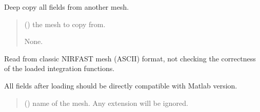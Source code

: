 \documentclass[letterpaper,10pt,english]{sphinxmanual}
\begin{document}
\begin{fulllineitems}
\begin{fulllineitems}
\begin{quote}
\begin{description}
\end{description}\end{quote}

\end{fulllineitems}


\begin{fulllineitems}
\label{\detokenize{_autosummary/nirfasterff.base.dcs_mesh.dcsmesh:nirfasterff.base.dcs_mesh.dcsmesh.from_copy}}
\pysigstartsignatures
{}
\pysigstopsignatures
\sphinxAtStartPar
Deep copy all fields from another mesh.
\begin{quote}\begin{description}
\sphinxAtStartPar
{} () \textendash{} the mesh to copy from.

\sphinxAtStartPar
None.

\end{description}\end{quote}

\end{fulllineitems}


\begin{fulllineitems}
\label{\detokenize{_autosummary/nirfasterff.base.dcs_mesh.dcsmesh:nirfasterff.base.dcs_mesh.dcsmesh.from_file}}
\pysigstartsignatures
{}
\pysigstopsignatures
\sphinxAtStartPar
Read from classic NIRFAST mesh (ASCII) format, not checking the correctness of the loaded integration functions.

\sphinxAtStartPar
All fields after loading should be directly compatible with Matlab version.
\begin{quote}\begin{description}
\sphinxAtStartPar
{} () \textendash{} name of the mesh. Any extension will be ignored.


\end{description}
\end{quote}
\end{fulllineitems}
\end{fulllineitems}
\end{document}
